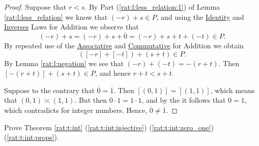 \begin{proof}
	Suppose that $r < s$. By Part (\ref{rat:l:less_relation:1}) of Lemma \ref{rat:l:less_relation} we know that $(-r) + s \in P$, and using the \hyperref[rat:t:props:identity_add]{Identity} and \hyperref[rat:t:props:inverses_add]{Inverses} Laws for Addition we observe that
	\[
		(-r) + s = (-r) + s + \overline{0} = (-r) + s + t + (-t) \in P.
	\]
	By repeated use of the \hyperref[rat:t:props:associative_add]{Associative} and \hyperref[rat:t:props:commutative_add]{Commutative} for Addition we obtain
	\[
		([-r] + [-t]) + (s + t) \in P.
	\]
	By Lemma \ref{rat:l:negation} we see that $(-r) + (-t) = -(r + t)$. Then $[-(r + t)] + (s + t) \in P$, and hence $r + t < s + t$.

	Suppose to the contrary that $\overline{0} = \overline{1}$. Then $[(0, 1)] = [(1, 1)]$, which means that $(0, 1) \asymp (1, 1)$. But then $0 \cdot 1 = 1 \cdot 1$, and by the  it follows that $0 = 1$, which contradicts  for integer numbers. Hence, $\overline{0} \not= \overline{1}$.
\end{proof}


\Newpage
\begin{exercise} %
	Prove Theorem \ref{rat:t:int} (\ref{rat:t:int:injective}) (\ref{rat:t:int:zero_one}) (\ref{rat:t:int:props}).
\end{exercise}

